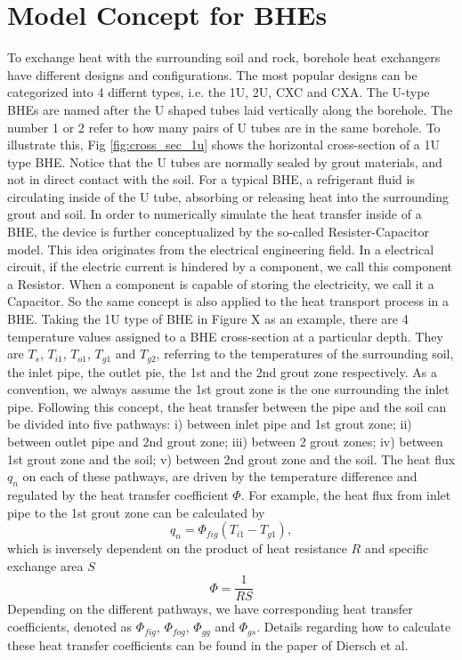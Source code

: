 \section{Model Concept for BHEs}
\label{sec:model_concept}
To exchange heat with the surrounding soil and rock, borehole heat exchangers have different designs and configurations. The most popular designs can be categorized into 4 differnt types, i.e. the 1U, 2U, CXC and CXA. The U-type BHEs are named after the U shaped tubes laid vertically along the borehole. The number 1 or 2 refer to how many pairs of U tubes are in the same borehole. To illustrate this, Fig \ref{fig:cross_sec_1u} shows the horizontal cross-section of a 1U type BHE. Notice that the U tubes are normally sealed by grout materials, and not in direct contact with the soil. For a typical BHE, a refrigerant fluid is circulating inside of the U tube, absorbing or releasing heat into the surrounding grout and soil. 
In order to numerically simulate the heat transfer inside of a BHE, the device is further conceptualized by the so-called Resister-Capacitor model. This idea originates from the electrical engineering field. In a electrical circuit, if the electric current is hindered by a component, we call this component a Resistor. When a component is capable of storing the electricity, we call it a Capacitor. So the same concept is also applied to the heat transport process in a BHE. Taking the 1U type of BHE in Figure X as an example, there are 4 temperature values assigned to a BHE cross-section at a particular depth. They are $T_s$, $T_{i1}$, $T_{o1}$, $T_{g1}$ and $T_{g2}$, referring to the temperatures of the surrounding soil, the inlet pipe, the outlet pie, the 1st and the 2nd grout zone respectively. As a convention, we always assume the 1st grout zone is the one surrounding the inlet pipe. Following this concept, the heat transfer between the pipe and the soil can be divided into five pathways: i) between inlet pipe and 1st grout zone; ii) between outlet pipe and 2nd grout zone; iii) between 2 grout zones; iv) between 1st grout zone and the soil; v) between 2nd grout zone and the soil. The heat flux $q_n$ on each of these pathways, are driven by the temperature difference and regulated by the heat transfer coefficient $\Phi$. For example, the heat flux from inlet pipe to the 1st grout zone can be calculated by 
\begin{equation}
\label{eqn:heat_transfer}
q_n = \Phi_{fig} \left( T_{i1} - T_{g1} \right), 
\end{equation} 
which is inversely dependent on the product of heat resistance $R$ and specific exchange area $S$
\begin{equation}
\Phi = \frac{1}{R S}
\end{equation}
Depending on the different pathways, we have corresponding heat transfer coefficients, denoted as $\Phi_{fig}$, $\Phi_{fog}$, $\Phi_{gg}$ and $\Phi_{gs}$. Details regarding how to calculate these heat transfer coefficients can be found in the paper of Diersch et al\cite{Diersch2011a}.  
~~\
